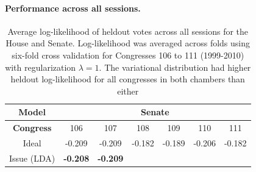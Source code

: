 \paragraph{Performance across all sessions.}

\begin{table}
  \caption{Average log-likelihood of heldout votes across all sessions
    for the House and Senate.  Log-likelihood was averaged across
    folds using six-fold cross validation for Congresses 106 to 111
    (1999-2010) with regularization $\lambda=1$.  The variational
    distribution had higher heldout log-likelihood for all congresses
    in both chambers than either } \center
  \begin{tabular}{|c|cccccc|}
    \hline
    \textbf{Model} & \multicolumn{6}{|c|}{\textbf{Senate}} \\
    \hline
    \textbf{Congress} & \hspace{-4pt} 106 \hspace{-5pt}
    & \hspace{-4pt} 107 \hspace{-5pt}
    & \hspace{-4pt} 108 \hspace{-5pt}
    & \hspace{-4pt} 109 \hspace{-5pt}
    & \hspace{-4pt} 110 \hspace{-5pt}
    & \hspace{-4pt} 111 \hspace{-4pt} \\
    \hline
    Ideal
    & \hspace{-4pt} -0.209 \hspace{-5pt}
    & \hspace{-4pt} -0.209 \hspace{-5pt}
    & \hspace{-4pt} -0.182 \hspace{-5pt}
    & \hspace{-4pt} -0.189 \hspace{-5pt}
    & \hspace{-4pt} -0.206 \hspace{-5pt}
    & \hspace{-4pt} -0.182 \hspace{-4pt} \\
    Issue (LDA)
    & \hspace{-4pt} \textbf{-0.208} \hspace{-5pt}
    & \hspace{-4pt} \textbf{-0.209} \hspace{-5pt}

\end{tabular}
\end{table}
